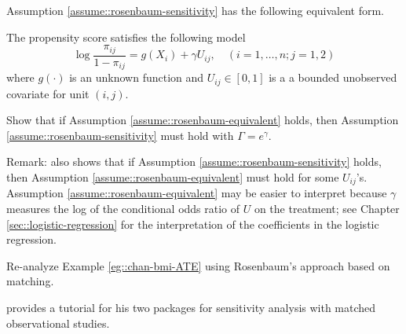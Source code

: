 \begin{HomeworkProblem}\label{exr:19-1}

Assumption \ref{assume::rosenbaum-sensitivity} has the following equivalent form.


\begin{assumption}
\label{assume::rosenbaum-equivalent}
The propensity score satisfies the following model
\[
\log \frac{  \pi_{ij} }{  1-\pi_{ij}  } = g(X_i) + \gamma U_{ij} ,\quad (i=1,\ldots, n; j=1,2)
\]
where $g(\cdot)$ is an unknown function and $U_{ij} \in [0, 1]$ is a a bounded unobserved covariate for unit $(i, j)$.
\end{assumption}


Show that if Assumption \ref{assume::rosenbaum-equivalent} holds, then Assumption \ref{assume::rosenbaum-sensitivity} must hold with $\Gamma = e^\gamma$.


Remark: \citet[][page 108]{rosenbaum2002design} also shows that if Assumption \ref{assume::rosenbaum-sensitivity} holds, then Assumption \ref{assume::rosenbaum-equivalent} must hold for some $U_{ij}$'s. Assumption \ref{assume::rosenbaum-equivalent} may be easier to interpret because $\gamma$ measures the log of the conditional odds ratio of $U$ on the treatment; see Chapter \ref{sec::logistic-regression} for the interpretation of the coefficients in the logistic regression.



\end{HomeworkProblem}

\begin{HomeworkProblem}\label{exr:19-2}
Re-analyze Example \ref{eg::chan-bmi-ATE} using Rosenbaum's approach based on matching.



\end{HomeworkProblem}

\begin{HomeworkProblem}\label{exr:19-3}


\citet{rosenbaum2015two} provides a tutorial for his two  packages for sensitivity analysis with matched observational studies.


\end{HomeworkProblem}
